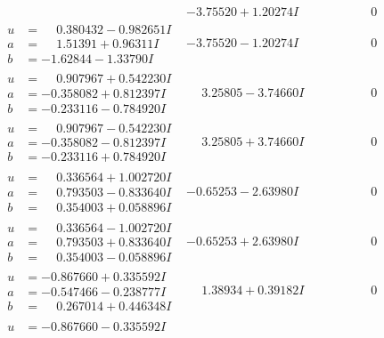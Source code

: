 \documentclass[1p]{elsarticle_modified}
\theoremstyle{definition}
\begin{document}
$$\begin{array}{c|c|c}
 & -3.75520 + 1.20274 I & \phantom{-0.000000 } 0 \\ \hline\begin{aligned}
u &= \phantom{-}0.380432 - 0.982651 I \\
a &= \phantom{-}1.51391 + 0.96311 I \\
b &= -1.62844 - 1.33790 I\end{aligned}
 & -3.75520 - 1.20274 I & \phantom{-0.000000 } 0 \\ \hline\begin{aligned}
u &= \phantom{-}0.907967 + 0.542230 I \\
a &= -0.358082 + 0.812397 I \\
b &= -0.233116 - 0.784920 I\end{aligned}
 & \phantom{-}3.25805 - 3.74660 I & \phantom{-0.000000 } 0 \\ \hline\begin{aligned}
u &= \phantom{-}0.907967 - 0.542230 I \\
a &= -0.358082 - 0.812397 I \\
b &= -0.233116 + 0.784920 I\end{aligned}
 & \phantom{-}3.25805 + 3.74660 I & \phantom{-0.000000 } 0 \\ \hline\begin{aligned}
u &= \phantom{-}0.336564 + 1.002720 I \\
a &= \phantom{-}0.793503 - 0.833640 I \\
b &= \phantom{-}0.354003 + 0.058896 I\end{aligned}
 & -0.65253 - 2.63980 I & \phantom{-0.000000 } 0 \\ \hline\begin{aligned}
u &= \phantom{-}0.336564 - 1.002720 I \\
a &= \phantom{-}0.793503 + 0.833640 I \\
b &= \phantom{-}0.354003 - 0.058896 I\end{aligned}
 & -0.65253 + 2.63980 I & \phantom{-0.000000 } 0 \\ \hline\begin{aligned}
u &= -0.867660 + 0.335592 I \\
a &= -0.547466 - 0.238777 I \\
b &= \phantom{-}0.267014 + 0.446348 I\end{aligned}
 & \phantom{-}1.38934 + 0.39182 I & \phantom{-0.000000 } 0 \\ \hline\begin{aligned}
u &= -0.867660 - 0.335592 I \\

\end{aligned}
\end{array}$$
\end{document}
